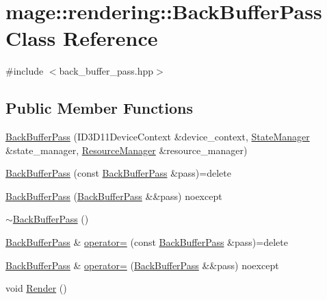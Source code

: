 \hypertarget{classmage_1_1rendering_1_1_back_buffer_pass}{}\section{mage\+:\+:rendering\+:\+:Back\+Buffer\+Pass Class Reference}
\label{classmage_1_1rendering_1_1_back_buffer_pass}


{\ttfamily \#include $<$back\+\_\+buffer\+\_\+pass.\+hpp$>$}

\subsection*{Public Member Functions}
\begin{DoxyCompactItemize}
\item 
\hyperlink{classmage_1_1rendering_1_1_back_buffer_pass_a054aad27e4b3d05baf235ae256934ef2}{Back\+Buffer\+Pass} (I\+D3\+D11\+Device\+Context \&device\+\_\+context, \hyperlink{classmage_1_1rendering_1_1_state_manager}{State\+Manager} \&state\+\_\+manager, \hyperlink{classmage_1_1rendering_1_1_resource_manager}{Resource\+Manager} \&resource\+\_\+manager)
\item 
\hyperlink{classmage_1_1rendering_1_1_back_buffer_pass_aa8042001dccc96e61b01a5775421a41d}{Back\+Buffer\+Pass} (const \hyperlink{classmage_1_1rendering_1_1_back_buffer_pass}{Back\+Buffer\+Pass} \&pass)=delete
\item 
\hyperlink{classmage_1_1rendering_1_1_back_buffer_pass_ac8dfbaabb766f4bfd61cfea8d01dd7dc}{Back\+Buffer\+Pass} (\hyperlink{classmage_1_1rendering_1_1_back_buffer_pass}{Back\+Buffer\+Pass} \&\&pass) noexcept
\item 
\hyperlink{classmage_1_1rendering_1_1_back_buffer_pass_a697a5e094cdcdf9f42dd2efdda957b57}{$\sim$\+Back\+Buffer\+Pass} ()
\item 
\hyperlink{classmage_1_1rendering_1_1_back_buffer_pass}{Back\+Buffer\+Pass} \& \hyperlink{classmage_1_1rendering_1_1_back_buffer_pass_acad71e5633ba37b1069c5a2ef9e6f704}{operator=} (const \hyperlink{classmage_1_1rendering_1_1_back_buffer_pass}{Back\+Buffer\+Pass} \&pass)=delete
\item 
\hyperlink{classmage_1_1rendering_1_1_back_buffer_pass}{Back\+Buffer\+Pass} \& \hyperlink{classmage_1_1rendering_1_1_back_buffer_pass_a79649b9316cb114bae032027406b4fe4}{operator=} (\hyperlink{classmage_1_1rendering_1_1_back_buffer_pass}{Back\+Buffer\+Pass} \&\&pass) noexcept
\item 
void \hyperlink{classmage_1_1rendering_1_1_back_buffer_pass_af0e8bab1a86d7f37934e9d76aa253b29}{Render} ()
\end{DoxyCompactItemize}
